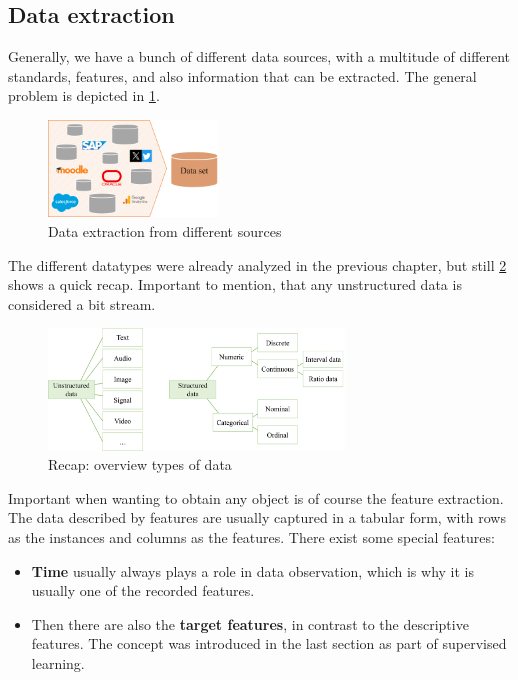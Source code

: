 \subsection{Data extraction}

Generally, we have a bunch of different data sources, with a multitude of different standards, features, and also information that can be extracted. The general problem is depicted in \ref{fig:2_data_extraction}.

\begin{figure}[H]
  \centering
  \includegraphics[width=0.4\textwidth]{assets/visualization_and_extraction/data_extraction.png}
  \caption{Data extraction from different sources}
  \label{fig:2_data_extraction}
\end{figure}

The different datatypes were already analyzed in the previous chapter, but still \ref{fig:2_data_types} shows a quick recap. Important to mention, that any unstructured data is considered a bit stream.

\begin{figure}[H]
  \centering
  \includegraphics[width=0.7\textwidth]{assets/visualization_and_extraction/data_types.png}
  \caption{Recap: overview types of data}
  \label{fig:2_data_types}
\end{figure}

Important when wanting to obtain any object is of course the feature extraction. The data described by features are usually captured in a tabular form, with rows as the instances and columns as the features. There exist some special features:
\begin{itemize}
  \item \textbf{Time} usually always plays a role in data observation, which is why it is usually one of the recorded features.
  \item Then there are also the \textbf{target features}, in contrast to the descriptive features. The concept was introduced in the last section as part of supervised learning.
\end{itemize}
